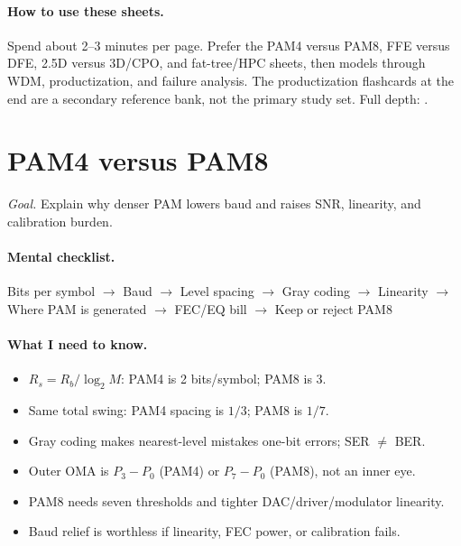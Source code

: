 \paragraph{How to use these sheets.}
Spend about 2--3 minutes per page. Prefer the PAM4 versus PAM8, FFE versus DFE,
2.5D versus 3D/CPO, and fat-tree/HPC sheets, then models through WDM,
productization, and failure analysis. The productization flashcards at the end
are a secondary reference bank, not the primary study set. Full depth:
.

\clearpage
\section{PAM4 versus PAM8}
\label{sec:cheat-pam}

\textit{Goal.} Explain why denser PAM lowers baud and raises SNR, linearity, and
calibration burden.

\paragraph{Mental checklist.}
Bits per symbol $\rightarrow$ Baud
$\rightarrow$ Level spacing $\rightarrow$ Gray coding $\rightarrow$ Linearity
$\rightarrow$ Where PAM is generated $\rightarrow$ FEC/EQ bill $\rightarrow$
Keep or reject PAM8

\paragraph{What I need to know.}
\begin{itemize}
\item $R_s=R_b/\log_2 M$: PAM4 is 2 bits/symbol; PAM8 is 3.
\item Same total swing: PAM4 spacing is $1/3$; PAM8 is $1/7$.
\item Gray coding makes nearest-level mistakes one-bit errors; SER $\neq$ BER.
\item Outer OMA is $P_3-P_0$ (PAM4) or $P_7-P_0$ (PAM8), not an inner eye.
\item PAM8 needs seven thresholds and tighter DAC/driver/modulator linearity.
\item Baud relief is worthless if linearity, FEC power, or calibration fails.
\end{itemize}

